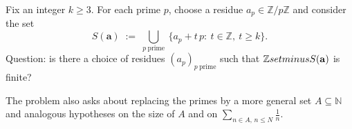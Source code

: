 Fix an integer $k\ge 3$. For each prime $p$, choose a residue $a_p\in\mathbb{Z}/p\mathbb{Z}$ and consider the set
\[
S(\mathbf a)\;:=\;\bigcup_{p\ \text{prime}}\ \{a_p+t\,p:\ t\in\mathbb{Z},\ t\ge k\}.
\]
Question: is there a choice of residues $(a_p)_{p\ \mathrm{prime}}$ such that
$\mathbb{Z}\\setminus S(\mathbf a)$ is finite?

The problem also asks about replacing the primes by a more general set $A\subseteq\mathbb{N}$ and
analogous hypotheses on the size of $A$ and on $\sum_{n\in A,\,n\le N}\frac1n$.
